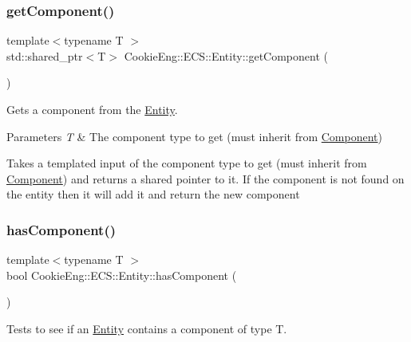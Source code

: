 \subsubsection{\texorpdfstring{get\+Component()}{getComponent()}}
{\footnotesize\ttfamily template$<$typename T $>$ \\
std\+::shared\+\_\+ptr$<$T$>$ Cookie\+Eng\+::\+E\+C\+S\+::\+Entity\+::get\+Component (\begin{DoxyParamCaption}{ }\end{DoxyParamCaption})\hspace{0.3cm}{\ttfamily [inline]}}



Gets a component from the \hyperlink{class_cookie_eng_1_1_e_c_s_1_1_entity}{Entity}. 


\begin{DoxyParams}{Parameters}
{\em T} & The component type to get (must inherit from \hyperlink{class_cookie_eng_1_1_e_c_s_1_1_component}{Component})\\
\hline
\end{DoxyParams}
Takes a templated input of the component type to get (must inherit from \hyperlink{class_cookie_eng_1_1_e_c_s_1_1_component}{Component}) and returns a shared pointer to it. If the component is not found on the entity then it will add it and return the new component \mbox{\label{class_cookie_eng_1_1_e_c_s_1_1_entity_a594daff6ddf321ac9c3a2fad3e50620e}} 
\subsubsection{\texorpdfstring{has\+Component()}{hasComponent()}}
{\footnotesize\ttfamily template$<$typename T $>$ \\
bool Cookie\+Eng\+::\+E\+C\+S\+::\+Entity\+::has\+Component (\begin{DoxyParamCaption}{ }\end{DoxyParamCaption})\hspace{0.3cm}{\ttfamily [inline]}}



Tests to see if an \hyperlink{class_cookie_eng_1_1_e_c_s_1_1_entity}{Entity} contains a component of type T. 


